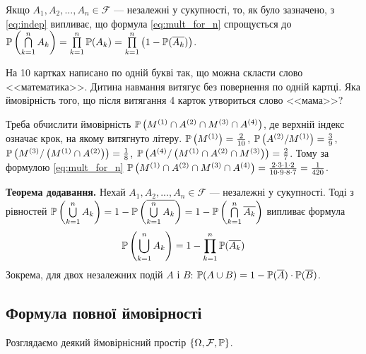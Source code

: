 Якщо $A_1, A_2, ..., A_n \in \mathcal{F}$ --- незалежні у сукупності, то, як було зазначено, з \eqref{eq:indep} випливає, що
формула \eqref{eq:mult_for_n} спрощується до $\P\left(\bigcap\limits_{k=1}^n A_k\right) = \prod\limits_{k=1}^n \P(A_k) = \prod\limits_{k=1}^n \left(1-\P(\overline{A_k})\right)$.

\begin{example}
    На 10 картках написано по одній букві так, що можна скласти слово <<математика>>.
    Дитина навмання витягує без повернення по одній картці. Яка ймовірність того, що після витягання 4 карток
    утвориться слово <<мама>>?

    Треба обчислити ймовірність $\P\left(M^{(1)} \cap A^{(2)} \cap M^{(3)} \cap A^{(4)}\right)$,
    де верхній індекс означає крок, на якому витягнуто літеру.
    $\P\left(M^{(1)}\right) = \frac{2}{10}$, $\P\left(A^{(2)} / M^{(1)}\right) = \frac{3}{9}$,
    $\P\left(M^{(3)}/\left(M^{(1)} \cap A^{(2)}\right)\right) = \frac{1}{8}$, $\P\left(A^{(4)} / \left(M^{(1)} \cap A^{(2)} \cap M^{(3)}\right)\right) = \frac{2}{7}$.
    Тому за формулою \eqref{eq:mult_for_n} $\P\left(M^{(1)} \cap A^{(2)} \cap M^{(3)} \cap A^{(4)}\right) = \frac{2 \cdot 3 \cdot 1 \cdot 2}{10 \cdot 9 \cdot 8 \cdot 7} = \frac{1}{420}$.
\end{example}

\noindent\textbf{Теорема додавання.}  
Нехай $A_1, A_2, ..., A_n \in \mathcal{F}$ --- незалежні у сукупності.
Тоді з рівностей $\P\left(\bigcup\limits_{k=1}^n A_k\right) = 1 - \P\left(\overline{\bigcup\limits_{k=1}^n A_k}\right) = 1 - \P\left(\bigcap\limits_{k=1}^n \overline{A_k}\right)$
випливає формула
\begin{equation}
    \P\left(\bigcup\limits_{k=1}^n A_k\right) = 1 - \prod\limits_{k=1}^n \P(\overline{A_k})
\end{equation}
Зокрема, для двох незалежних подій $A$ і $B$: $\P(A\cup B) = 1 - \P(\overline{A}) \cdot \P(\overline{B})$.

\subsection{Формула повної ймовірності}
Розглядаємо деякий ймовірнісний простір $\left\{ \Omega, \mathcal{F}, \P\right\}$.

